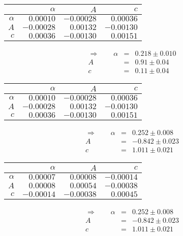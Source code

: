 \begin{tabular}{|r|r|r|r|}
 \hline 
\cellcolor{tabcolor}&\cellcolor{tabcolor}$\alpha$&\cellcolor{tabcolor}$A$&\cellcolor{tabcolor}$c$\\ \hline 
 \cellcolor{tabcolor}$\alpha$&$0.00010$ &$-0.00028$ &$0.00036$ \\ \hline
\cellcolor{tabcolor}$A$&$-0.00028$ &$0.00132$ &$-0.00130$ \\ \hline
\cellcolor{tabcolor}$c$&$0.00036$ &$-0.00130$ &$0.00151$ \\ \hline
\end{tabular}
\begin{align}\Rightarrow \qquad
    \alpha &=& 0.218 \pm 0.010 \\
    A &=& 0.91 \pm 0.04 \\
    c &=& 0.11 \pm 0.04 
\end{align}

 \begin{tabular}{|r|r|r|r|}
 \hline 
\cellcolor{tabcolor}&\cellcolor{tabcolor}$\alpha$&\cellcolor{tabcolor}$A$&\cellcolor{tabcolor}$c$\\ \hline 
 \cellcolor{tabcolor}$\alpha$&$0.00010$ &$-0.00028$ &$0.00036$ \\ \hline
\cellcolor{tabcolor}$A$&$-0.00028$ &$0.00132$ &$-0.00130$ \\ \hline
\cellcolor{tabcolor}$c$&$0.00036$ &$-0.00130$ &$0.00151$ \\ \hline
\end{tabular}
\begin{align}\Rightarrow \qquad
    \alpha &=& 0.252 \pm 0.008 \\
    A &=& -0.842 \pm 0.023 \\
    c &=& 1.011 \pm 0.021 
\end{align}

 \begin{tabular}{|r|r|r|r|}
 \hline 
\cellcolor{tabcolor}&\cellcolor{tabcolor}$\alpha$&\cellcolor{tabcolor}$A$&\cellcolor{tabcolor}$c$\\ \hline 
 \cellcolor{tabcolor}$\alpha$&$0.00007$ &$0.00008$ &$-0.00014$ \\ \hline
\cellcolor{tabcolor}$A$&$0.00008$ &$0.00054$ &$-0.00038$ \\ \hline
\cellcolor{tabcolor}$c$&$-0.00014$ &$-0.00038$ &$0.00045$ \\ \hline
\end{tabular}
\begin{align}\Rightarrow \qquad
    \alpha &=& 0.252 \pm 0.008 \\
    A &=& -0.842 \pm 0.023 \\
    c &=& 1.011 \pm 0.021 
\end{align}

